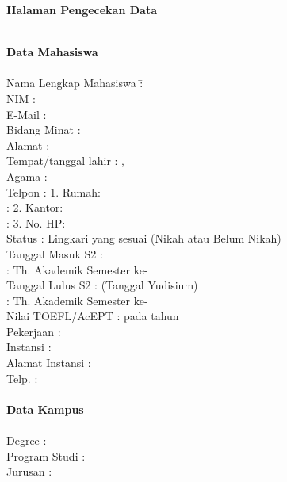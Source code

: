 \newpage
\thispagestyle{empty}
\begin{center}
{\normalfont\Large\bfseries\expandafter{Halaman Pengecekan Data}}
\par\nobreak

\vspace{.5cm}
\normalsize
\onehalfspacing
\begin{tabbing}
	\HRule	\\
	{\bfseries Data Mahasiswa}	\\
	\HRule 	\\
	Nama Lengkap Mahasiswa 	\= 	: \@fullname \\
	NIM						\>	: \@idnum \\
	E-Mail					\>	: \@email \\
	Bidang Minat			\>	: \@minat \\
	Alamat					\>	: \@alamat \\
	Tempat/tanggal lahir	\>	: \@tmplahir, \@tgllahir \\
	Agama					\>	: \@agama\\
	Telpon					\>	: 1. Rumah: \@noRumah \\
							\>	: 2. Kantor: \@noKantor \\
							\>	: 3. No. HP: \@noHP \\
	Status					\>	: Lingkari yang sesuai (Nikah atau Belum Nikah) \\
	Tanggal Masuk S2		\>	: \@mastermasuk \\
							\>	: Th. Akademik \@thakademikmasuk \space Semester ke-\@semestermasuk \\
	Tanggal Lulus S2		\>	: \@masterlulus \space (Tanggal Yudisium)\\
							\>	: Th. Akademik \@thakademiklulus \space Semester ke-\@semesterlulus \\
	Nilai TOEFL/AcEPT		\>	: \@nilaiTestEnglish \space pada tahun \@tahunTest \\
	Pekerjaan				\>	: \@job \\
	Instansi				\>	: \@instansi \\
	Alamat Instansi			\>	: \@instansialamat \\
	Telp.					\>	: \@instansitelp \\	
	\HRule	\\
	{\bfseries Data Kampus}	\\
	\HRule 	\\
	Degree					\>	: \@degree \\
	Program Studi			\>	: \@program \\
	Jurusan					\>	: \@jurusan \\

\end{tabbing}
\end{center}
